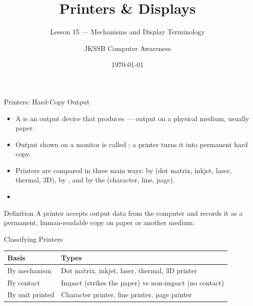 \documentclass[aspectratio=169]{beamer}
\title{Printers \& Displays}
\subtitle{Lesson 15 --- Mechanisms and Display Terminology}
\author{JKSSB Computer Awareness}
\date{\today}
\begin{document}
\frame{\titlepage}

\begin{frame}{Printers: Hard-Copy Output}
  \begin{itemize}
    \item A  is an output device that produces 
      --- output on a physical medium, usually paper.
    \item Output shown on a monitor is called ; a printer turns
      it into permanent hard copy.
    \item Printers are compared in three main ways: by 
      (dot matrix, inkjet, laser, thermal, 3D), by ,
      and by the  (character, line, page).
    \item {}
  \end{itemize}
  \begin{block}{Definition}
    A printer accepts output data from the computer and records it as a
    permanent, human-readable copy on paper or another medium.
  \end{block}
\end{frame}

\begin{frame}{Classifying Printers}
  \begin{center}
    \begin{tabular}{p{}p{}}
      \toprule
      \textbf{Basis} & \textbf{Types} \\
      \midrule
      By mechanism & Dot matrix, inkjet, laser, thermal, 3D printer \\
      By contact & Impact (strikes the paper) vs non-impact (no contact) \\
      By unit printed & Character printer, line printer, page printer \\
      \bottomrule
    \end{tabular}
  \end{center}
  \vspace{0.25cm}
\end{frame}
\end{document}
